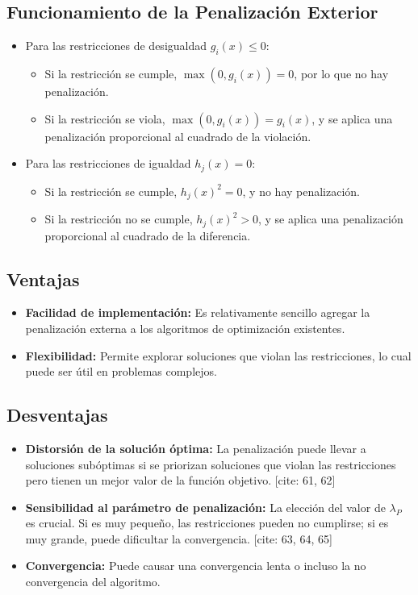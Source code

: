 \subsection*{Funcionamiento de la Penalización Exterior}

\begin{itemize}
    \item Para las restricciones de desigualdad \( g_i(x) \leq 0 \):
    \begin{itemize}
        \item Si la restricción se cumple, \( \max(0, g_i(x)) = 0 \), por lo que no hay penalización.
        \item Si la restricción se viola, \( \max(0, g_i(x)) = g_i(x) \), y se aplica una penalización proporcional al cuadrado de la violación.
    \end{itemize}
    \item Para las restricciones de igualdad \( h_j(x) = 0 \):
    \begin{itemize}
        \item Si la restricción se cumple, \( h_j{(x)}^2 = 0 \), y no hay penalización.
        \item Si la restricción no se cumple, \( h_j{(x)}^2 > 0 \), y se aplica una penalización proporcional al cuadrado de la diferencia.
    \end{itemize}
\end{itemize}

\subsection*{Ventajas}

\begin{itemize}
    \item \textbf{Facilidad de implementación:} Es relativamente sencillo agregar la penalización externa a los algoritmos de optimización existentes.
    \item \textbf{Flexibilidad:} Permite explorar soluciones que violan las restricciones, lo cual puede ser útil en problemas complejos.
\end{itemize}

\subsection*{Desventajas}

\begin{itemize}
    \item \textbf{Distorsión de la solución óptima:} La penalización puede llevar a soluciones subóptimas si se priorizan soluciones que violan las restricciones pero tienen un mejor valor de la función objetivo. [cite: 61, 62]
    \item \textbf{Sensibilidad al parámetro de penalización:} La elección del valor de \( \lambda_P \) es crucial. Si es muy pequeño, las restricciones pueden no cumplirse; si es muy grande, puede dificultar la convergencia. [cite: 63, 64, 65]
    \item \textbf{Convergencia:} Puede causar una convergencia lenta o incluso la no convergencia del algoritmo.
\end{itemize}